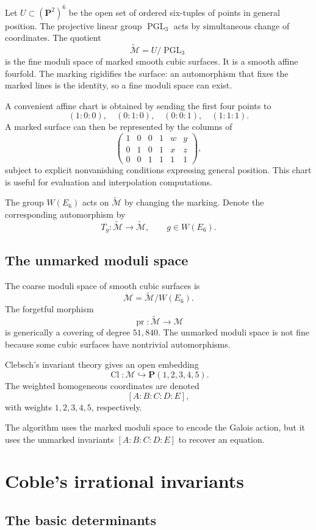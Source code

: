 \documentclass[11pt]{article}
\newcommand{\PP}{\mathbf{P}}
\newcommand{\cM}{\mathcal{M}}
\newcommand{\tcM}{\widetilde{\mathcal{M}}}
\begin{document}
Let $U\subset (\PP^2)^6$ be the open set of ordered six-tuples of points in
general position.  The projective linear group $\operatorname{PGL}_3$ acts by
simultaneous change of coordinates.  The quotient
\[
  \tcM = U/\operatorname{PGL}_3
\]
is the fine moduli space of marked smooth cubic surfaces.  It is a smooth
affine fourfold.  The marking rigidifies the surface: an automorphism that
fixes the marked lines is the identity, so a fine moduli space can exist.

A convenient affine chart is obtained by sending the first four points to
\[
 (1:0:0),\quad (0:1:0),\quad (0:0:1),\quad (1:1:1).
\]
A marked surface can then be represented by the columns of
\[
 \begin{pmatrix}
  1&0&0&1&w&y\\
  0&1&0&1&x&z\\
  0&0&1&1&1&1
 \end{pmatrix},
\]
subject to explicit nonvanishing conditions expressing general position.
This chart is useful for evaluation and interpolation computations.

The group $W(E_6)$ acts on $\tcM$ by changing the marking.  Denote the
corresponding automorphism by
\[
  T_g:\tcM\longrightarrow\tcM,
  \qquad g\in W(E_6).
\]

\subsection{The unmarked moduli space}

The coarse moduli space of smooth cubic surfaces is
\[
  \cM=\tcM/W(E_6).
\]
The forgetful morphism
\[
  \operatorname{pr}:\tcM\longrightarrow\cM
\]
is generically a covering of degree $51{,}840$.  The unmarked moduli space is
not fine because some cubic surfaces have nontrivial automorphisms.

Clebsch's invariant theory gives an open embedding
\[
  \operatorname{Cl}:\cM\hookrightarrow \PP(1,2,3,4,5).
\]
The weighted homogeneous coordinates are denoted
\[
  [A:B:C:D:E],
\]
with weights $1,2,3,4,5$, respectively.

The algorithm uses the marked moduli space to encode the Galois action, but
it uses the unmarked invariants $[A:B:C:D:E]$ to recover an equation.

\section{Coble's irrational invariants}

\subsection{The basic determinants}
\end{document}
